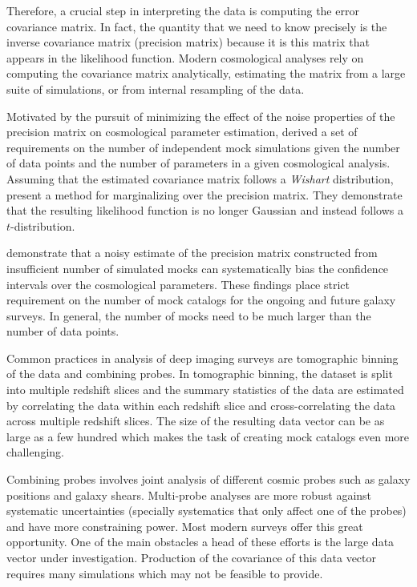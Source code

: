 Therefore, a crucial step in interpreting the data is computing the error covariance matrix. 
In fact, the quantity that we need to know precisely is the inverse covariance matrix (precision matrix) because it is this matrix that appears in the likelihood function. Modern cosmological analyses rely on computing the covariance matrix analytically, estimating the matrix from a large suite of simulations, or from internal resampling of the data. 

Motivated by the pursuit of minimizing the effect of the noise properties of the precision matrix on 
cosmological parameter estimation, \citet{dodelson2013,taylor2013,taylor2014} derived a set of requirements 
on the number of independent mock simulations given the number of data points and the number of parameters 
in a given cosmological analysis. Assuming that the estimated covariance matrix follows a \emph{Wishart} distribution, 
\citep{Sellentin:2016a} present a method for marginalizing over the precision matrix. They demonstrate that the 
resulting likelihood function is no longer Gaussian and instead follows a $t$-distribution.

\citet{dodelson2013,Sellentin:2017a} demonstrate that a noisy estimate of the precision matrix 
constructed from insufficient number of simulated mocks can systematically bias the confidence 
intervals over the cosmological parameters. These findings place strict requirement on the number of 
mock catalogs for the ongoing and future galaxy surveys. In general, the number of mocks need to be much larger than 
the number of data points.

Common practices in analysis of deep imaging surveys are tomographic binning of the data and combining probes.
In tomographic binning, the dataset is split into multiple redshift slices and the summary statistics of 
the data are estimated by correlating the data within each redshift slice and cross-correlating the data across 
multiple redshift slices. The size of the resulting data vector can be as large as a few hundred which makes the task of creating mock catalogs even more challenging. 

Combining probes involves joint analysis of different cosmic probes such as galaxy 
positions and galaxy shears. Multi-probe analyses are more robust against systematic 
uncertainties (specially systematics that only affect one of the probes) 
and have more constraining power. Most modern surveys offer this great opportunity. 
One of the main obstacles a head of these efforts is the large data vector under investigation. 
Production of the covariance of this data vector requires many simulations which may not 
be feasible to provide.   


